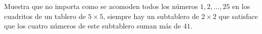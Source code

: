 Muestra que no importa como se acomoden todos los números $1, 2, \dots , 25$ en los cuadritos de un tablero de $5 \times  5$, siempre hay un subtablero de $2 \times  2$ que satisface que los cuatro números de este subtablero suman más de $41$.